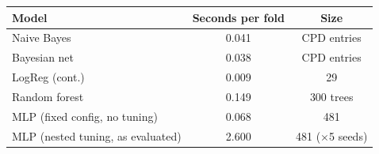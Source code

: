 \begin{tabular}{lcc}
\toprule
Model & Seconds per fold & Size \\
\midrule
Naive Bayes & 0.041 & CPD entries \\
Bayesian net & 0.038 & CPD entries \\
LogReg (cont.) & 0.009 & 29 \\
Random forest & 0.149 & 300 trees \\
MLP (fixed config, no tuning) & 0.068 & 481 \\
MLP (nested tuning, as evaluated) & 2.600 & 481 ($\times$5 seeds) \\
\bottomrule
\end{tabular}
